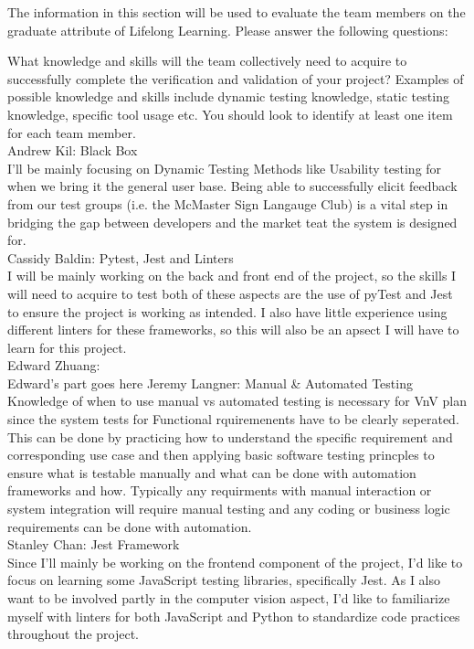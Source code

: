 \documentclass[12pt, titlepage]{article}
\begin{document}

The information in this section will be used to evaluate the team members on the
graduate attribute of Lifelong Learning.  Please answer the following questions:

\begin{outline}[enumerate]
  \1 What knowledge and skills will the team collectively need to acquire to
  successfully complete the verification and validation of your project?
  Examples of possible knowledge and skills include dynamic testing knowledge,
  static testing knowledge, specific tool usage etc.  You should look to
  identify at least one item for each team member.\\
    \2 Andrew Kil: Black Box\\
    I'll be mainly focusing on Dynamic Testing Methods like Usability testing for when we bring it the general user base. Being able to successfully elicit feedback from our test groups (i.e. the McMaster Sign Langauge Club) is a vital step in bridging the gap between developers and the market teat the system is designed for.\\
    \2 Cassidy Baldin: Pytest, Jest and Linters\\
     I will be mainly working on the back and front end of the project, so the skills I will need to acquire to test both of these aspects are the use of pyTest and Jest to ensure the project is working as intended. I also have little experience using different linters for these frameworks, so this will also be an apsect I will have to learn for this project.\\
    \2 Edward Zhuang: \\
	Edward's part goes here
    \2 Jeremy Langner: Manual \& Automated Testing \\
    Knowledge of when to use manual vs automated testing is necessary for VnV plan since the system tests for Functional rquiremenents have to be clearly seperated. This can be done by practicing how to understand the specific requirement and corresponding use case and then applying basic software testing princples to ensure what is testable manually and what can be done with automation frameworks and how. Typically any requirments with manual interaction or system integration will require manual testing and any coding or business logic requirements can be done with automation.\\
    \2 Stanley Chan: Jest Framework \\
    Since I'll mainly be working on the frontend component of the project, I'd like to focus on learning some JavaScript testing libraries, specifically Jest. As I also want to be involved partly in the computer vision aspect, I'd like to familiarize myself with linters for both JavaScript and Python to standardize code practices throughout the project.\\

\end{outline}
\end{document}
